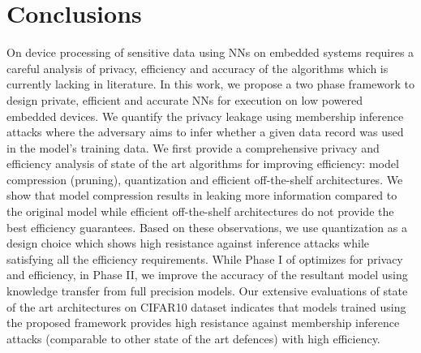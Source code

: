 \section{Conclusions}\label{conclusions}

On device processing of sensitive data using NNs on embedded systems requires a careful analysis of privacy, efficiency and accuracy of the algorithms which is currently lacking in literature.
In this work, we propose a two phase \method\hspace{0.02in} framework to design private, efficient and accurate NNs for execution on low powered embedded devices.
We quantify the privacy leakage using membership inference attacks where the adversary aims to infer whether a given data record was used in the model's training data.
We first provide a comprehensive privacy and efficiency analysis of state of the art algorithms for improving efficiency: model compression (pruning), quantization and efficient off-the-shelf architectures.
We show that model compression results in leaking more information compared to the original model while efficient off-the-shelf architectures do not provide the best efficiency guarantees.
Based on these observations, we use quantization as a design choice which shows high resistance against inference attacks while satisfying all the efficiency requirements.
While Phase I of \method\hspace{0.02in} optimizes for privacy and efficiency, in Phase II, we improve the accuracy of the resultant model using knowledge transfer from full precision models.
Our extensive evaluations of state of the art architectures on CIFAR10 dataset indicates that models trained using the proposed framework provides high resistance against membership inference attacks (comparable to other state of the art defences) with high efficiency.
